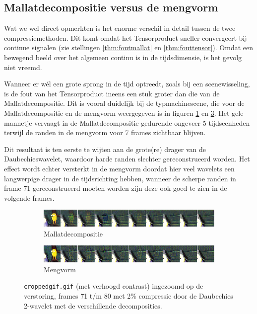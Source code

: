 \subsection{Mallatdecompositie versus de mengvorm}
Wat we wel direct opmerkten is het enorme verschil in detail tussen de twee compressiemethoden. 
Dit komt omdat het Tensorproduct sneller convergeert bij continue signalen 
(zie stellingen \ref{thm:foutmallat} en \ref{thm:fouttensor}). 
Omdat een bewegend beeld over het algemeen continu is in de tijdsdimensie, is het gevolg niet vreemd.

Wanneer er w\'el een grote sprong in de tijd optreedt, zoals bij een scenewisseling, is de fout van 
het Tensorproduct ineens een stuk groter dan die van de Mallatdecompositie. 
Dit is vooral duidelijk bij de typmachinescene, die voor de Mallatdecompositie en de mengvorm
weergegeven is in figuren \ref{fig:frames_tensor} en \ref{fig:frames_nontensor}.
Het gele mannetje vervaagt in de Mallatdecompositie gedurende ongeveer 5 tijdseenheden 
terwijl de randen in de mengvorm voor 7 frames zichtbaar blijven.

Dit resultaat is ten eerste te wijten aan de grote(re) drager van de Daubechieswavelet, 
waardoor harde randen slechter gereconstrueerd worden.
Het effect wordt echter versterkt in de mengvorm doordat hier veel wavelets een langwerpige
drager in de tijdsrichting hebben, wanneer de scherpe randen in frame $71$ gereconstrueerd moeten worden
zijn deze ook goed te zien in de volgende frames.

\begin{figure}[h]
\centering
\begin{subfigure}{\linewidth}
\includegraphics[width=\linewidth]{plaatjes/frames_notensor_small.png}
\caption{Mallatdecompositie}
\label{fig:frames_tensor}
\end{subfigure}
\centering
\begin{subfigure}{\linewidth}
\includegraphics[width=\linewidth]{plaatjes/frames_tensor_small.png}
\caption{Mengvorm}
\label{fig:frames_nontensor}
\end{subfigure}
\caption{\texttt{croppedgif.gif} (met verhoogd contrast) ingezoomd op de verstoring, frames 71 t/m 80 met 2\% compressie door de Daubechies 2-wavelet
met de verschillende decomposities.}
\end{figure}
